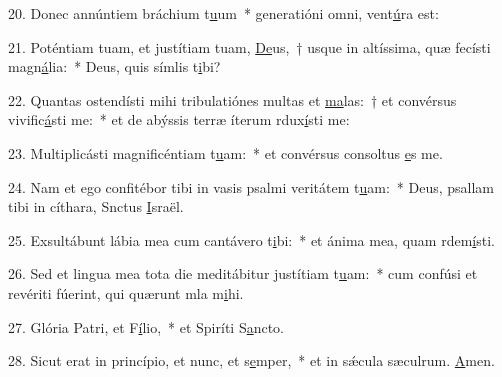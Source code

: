 20. Donec annúntiem bráchium t\uline{u}um~* generatióni omni,  vent\uline{ú}ra est:\par 
21. Poténtiam tuam, et justítiam tuam, \uline{De}us,~† usque in altíssima, quæ fecísti magn\uline{á}lia:~* Deus, quis símlis t\uline{i}bi?\par 
22. Quantas ostendísti mihi tribulatiónes multas et \uline{ma}las:~† et convérsus vivific\uline{á}sti me:~* et de abýssis terræ íterum rdux\uline{í}sti me:\par 
23. Multiplicásti magnificéntiam t\uline{u}am:~* et convérsus consoltus \uline{e}s me.\par 
24. Nam et ego confitébor tibi in vasis psalmi veritátem t\uline{u}am:~* Deus, psallam tibi in cíthara, Snctus \uline{I}sraël.\par 
25. Exsultábunt lábia mea cum cantávero t\uline{i}bi:~* et ánima mea, quam rdem\uline{í}sti.\par 
26. Sed et lingua mea tota die meditábitur justítiam t\uline{u}am:~* cum confúsi et revériti fúerint, qui quærunt mla m\uline{i}hi.\par 
27. Glória Patri, et F\uline{í}lio,~* et Spiríti S\uline{a}ncto.\par 
28. Sicut erat in princípio, et nunc, et s\uline{e}mper,~* et in sǽcula sæculrum. \uline{A}men.\par 
